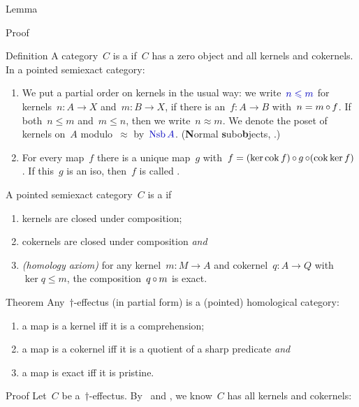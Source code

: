 \documentclass[b]{subfiles}
\begin{document}
\begin{parsec}
\begin{point}{Lemma}
\begin{point}{Proof}
\end{point}
\end{point}
\begin{point}{Definition}%
A category~$C$ is a  \cite[\S1.1]{grandis}
    if~$C$ has a zero object and all kernels and cokernels.
In a pointed semiexact category:
\begin{enumerate}
\item
We put a partial order on kernels in the usual way:
we write~$\Define{n \leq m}$
for kernels~$n\colon A \to X$ and~$m \colon B \to X$,
    if there is an~$f\colon A \to B$
    with~$n = m \mathop{\circ} f$.
If both~$n \leq m$ and~$m \leq n$,
    then we write~$n \approx m$.
We denote the poset of kernels on~$A$ modulo~$\approx$
        by~$\Define{\Nsb A}$. (\textbf{N}ormal \textbf{s}ubo\textbf{b}jects,
            \cite[\S1.5]{grandis}.)
\item
For every map~$f$
    there is a unique map~$g$
        with~$f = (\ker \operatorname{cok} f ) \mathop{\circ} g \mathop{\circ} (\operatorname{cok} \ker f)$.
    If this~$g$ is an iso, then~$f$ is called .
\end{enumerate}
A pointed semiexact category~$C$
    is a  if
\begin{enumerate}
    \item kernels are closed under composition;
    \item cokernels are closed under composition \emph{and}
    \item \emph{(homology axiom)}
        for any kernel~$m\colon M \to A$
        and cokernel~$q\colon A \to Q$
        with~$\ker q \leq m$,
        the composition~$q \mathop{\circ} m$ is exact.
\end{enumerate}
\end{point}
\begin{point}{Theorem}%
Any~$\dagger$-effectus (in partial form) is a (pointed) homological category:
\begin{enumerate}
    \item 
        a map is a kernel iff it is a comprehension;
    \item
        a map is a cokernel iff it is a quotient of a sharp predicate \emph{and}
    \item
        a map is exact iff it is pristine.
\end{enumerate}
\begin{point}{Proof}%
Let~$C$ be a~$\dagger$-effectus.
By~ and ,
    we know~$C$ has all kernels and cokernels:

\end{point}
\end{point}
\end{parsec}
\end{document}
